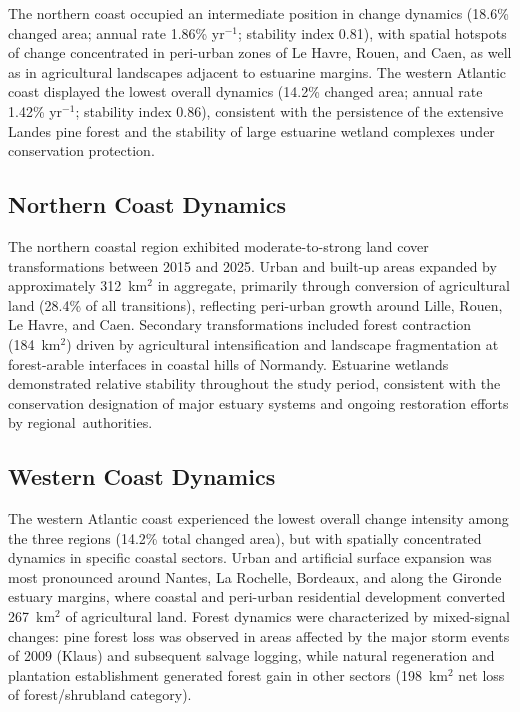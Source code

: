 \documentclass[coasts,article,accept,pdftex,moreauthors]{Definitions/mdpi}
\begin{document}
The northern coast occupied an intermediate position in change dynamics (18.6\% changed area; annual rate 1.86\% yr$^{-1}$; stability index 0.81), with spatial hotspots of change concentrated in peri-urban zones of Le Havre, Rouen, and Caen, as well as in agricultural landscapes adjacent to estuarine margins. The western Atlantic coast displayed the lowest overall dynamics (14.2\% changed area; annual rate 1.42\% yr$^{-1}$; stability index 0.86), consistent with the persistence of the extensive Landes pine forest and the stability of large estuarine wetland complexes under conservation protection.



\subsection{Northern Coast Dynamics}

The northern coastal region exhibited moderate-to-strong land cover transformations between 2015 and 2025. Urban and built-up areas expanded by approximately 312~km$^2$ in aggregate, primarily through conversion of agricultural land (28.4\% of all transitions), reflecting peri-urban growth around Lille, Rouen, Le Havre, and Caen. Secondary transformations included forest contraction (184~km$^2$) driven by agricultural intensification and landscape fragmentation at forest-arable interfaces in coastal hills of Normandy. Estuarine wetlands demonstrated relative stability throughout the study period, consistent with the conservation designation of major estuary systems and ongoing restoration efforts by regional~authorities.


\subsection{Western Coast Dynamics}

The western Atlantic coast experienced the lowest overall change intensity among the three regions (14.2\% total changed area), but with spatially concentrated dynamics in specific coastal sectors. Urban and artificial surface expansion was most pronounced around Nantes, La Rochelle, Bordeaux, and along the Gironde estuary margins, where coastal and peri-urban residential development converted 267~km$^2$ of agricultural land. Forest dynamics were characterized by mixed-signal changes: pine forest loss was observed in areas affected by the major storm events of 2009 (Klaus) and subsequent salvage logging, while natural regeneration and plantation establishment generated forest gain in other sectors (198~km$^2$ net loss of forest/shrubland category).
\end{document}
